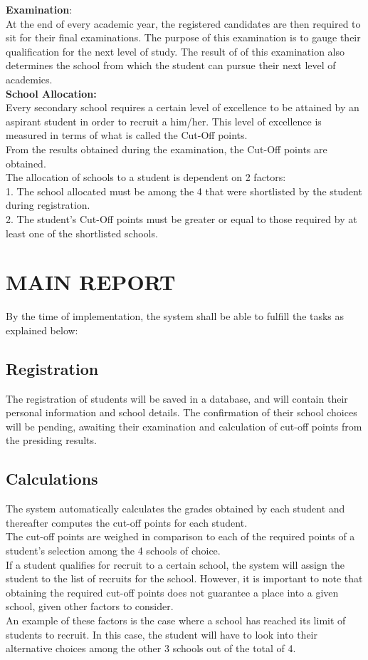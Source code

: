 \documentclass {article}
\begin{document}
\textbf{Examination}:\\

At the end of every academic year, the registered candidates are then required to sit for their final examinations. The purpose of this examination is to gauge their qualification for the next level of study. The result of of this examination also determines the school from which the student can pursue their next level of academics.\\

\textbf{School Allocation:}\\
Every secondary school requires a certain level of excellence to be attained by an aspirant student in order to recruit a him/her. This level of excellence is measured in terms of what is called the Cut-Off points.\\ 
From the results obtained during the examination, the Cut-Off points are obtained. \\
The allocation of schools to a student is dependent on 2 factors:\\
1. The school allocated must be among the 4 that were shortlisted by the student during registration.\\
2. The  student's Cut-Off points must be greater or equal to those required by at least one of the shortlisted schools.\\

\section{MAIN REPORT}
By the time of implementation, the system shall be able to fulfill the tasks as explained below:

\subsection{Registration}
The registration of students will be saved in a database, and will contain their personal information and school details. The confirmation of their school choices will be pending, awaiting their examination and calculation of cut-off points from the presiding results.

\subsection{Calculations}
The system automatically calculates the grades obtained by each student and thereafter computes the cut-off points for each student.\\
The cut-off points are weighed in comparison to each of the required points of a student's selection among the 4 schools of choice.\\
If a student qualifies for recruit to a certain school, the system will assign the student to the list of recruits for the school. However, it is important to note that obtaining the required cut-off points does not guarantee a place into a given school, given other factors to consider.\\
An example of these factors is the case where a school has reached its limit of students to recruit. In this case, the student will have to look into their alternative choices among the other 3 schools out of the total of 4.
\end{document}
